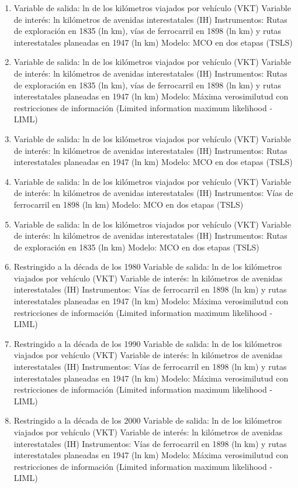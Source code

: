 \documentclass[
]{article}
\begin{document}
\begin{enumerate}
\def\labelenumi{\Alph{enumi}.}
\item
  Variable de salida: ln de los kilómetros viajados por vehículo (VKT)
  Variable de interés: ln kilómetros de avenidas interestatales (IH)
  Instrumentos: Rutas de exploración en 1835 (ln km), vías de
  ferrocarril en 1898 (ln km) y rutas interestatales planeadas en 1947
  (ln km) Modelo: MCO en dos etapas (TSLS)
\item
  Variable de salida: ln de los kilómetros viajados por vehículo (VKT)
  Variable de interés: ln kilómetros de avenidas interestatales (IH)
  Instrumentos: Rutas de exploración en 1835 (ln km), vías de
  ferrocarril en 1898 (ln km) y rutas interestatales planeadas en 1947
  (ln km) Modelo: Máxima verosimilutud con restricciones de información
  (Limited information maximum likelihood - LIML)
\item
  Variable de salida: ln de los kilómetros viajados por vehículo (VKT)
  Variable de interés: ln kilómetros de avenidas interestatales (IH)
  Instrumentos: Rutas interestatales planeadas en 1947 (ln km) Modelo:
  MCO en dos etapas (TSLS)
\item
  Variable de salida: ln de los kilómetros viajados por vehículo (VKT)
  Variable de interés: ln kilómetros de avenidas interestatales (IH)
  Instrumentos: Vías de ferrocarril en 1898 (ln km) Modelo: MCO en dos
  etapas (TSLS)
\item
  Variable de salida: ln de los kilómetros viajados por vehículo (VKT)
  Variable de interés: ln kilómetros de avenidas interestatales (IH)
  Instrumentos: Rutas de exploración en 1835 (ln km) Modelo: MCO en dos
  etapas (TSLS)
\item
  Restringido a la década de los 1980 Variable de salida: ln de los
  kilómetros viajados por vehículo (VKT) Variable de interés: ln
  kilómetros de avenidas interestatales (IH) Instrumentos: Vías de
  ferrocarril en 1898 (ln km) y rutas interestatales planeadas en 1947
  (ln km) Modelo: Máxima verosimilutud con restricciones de información
  (Limited information maximum likelihood - LIML)
\item
  Restringido a la década de los 1990 Variable de salida: ln de los
  kilómetros viajados por vehículo (VKT) Variable de interés: ln
  kilómetros de avenidas interestatales (IH) Instrumentos: Vías de
  ferrocarril en 1898 (ln km) y rutas interestatales planeadas en 1947
  (ln km) Modelo: Máxima verosimilutud con restricciones de información
  (Limited information maximum likelihood - LIML)
\item
  Restringido a la década de los 2000 Variable de salida: ln de los
  kilómetros viajados por vehículo (VKT) Variable de interés: ln
  kilómetros de avenidas interestatales (IH) Instrumentos: Vías de
  ferrocarril en 1898 (ln km) y rutas interestatales planeadas en 1947
  (ln km) Modelo: Máxima verosimilutud con restricciones de información
  (Limited information maximum likelihood - LIML)
\end{enumerate}
\end{document}
